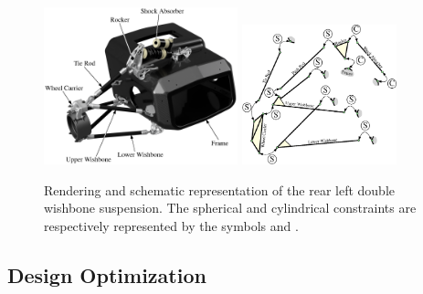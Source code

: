 \begin{figure}[!ht]
  \centering
  \includegraphics[width=0.5\textwidth, trim={2cm 2cm 2.5cm 2cm}, clip]{./figures/chapter_7/rendering.eps}
  \includegraphics[width=0.4\textwidth]{./figures/chapter_7/constraints.eps}
  \caption{Rendering and schematic representation of the rear left double wishbone suspension. The spherical and cylindrical constraints are respectively represented by the symbols  and .}
  \label{chap7:fig:suspension}
\end{figure}

\subsection{Design Optimization}

